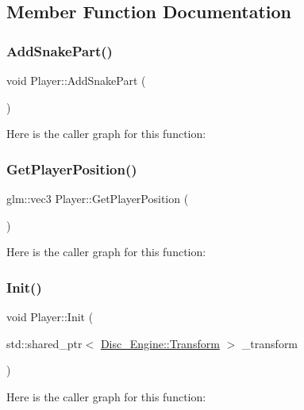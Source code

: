 \subsection{Member Function Documentation}
\mbox{\label{class_player_a58bb36e752a92fd5758900e49cdab663}} 
\subsubsection{\texorpdfstring{Add\+Snake\+Part()}{AddSnakePart()}}
{\footnotesize\ttfamily void Player\+::\+Add\+Snake\+Part (\begin{DoxyParamCaption}{ }\end{DoxyParamCaption})}

Here is the caller graph for this function\+:
\mbox{\label{class_player_a3c32ec6529ebd0e72bd286f80f01ebea}} 
\subsubsection{\texorpdfstring{Get\+Player\+Position()}{GetPlayerPosition()}}
{\footnotesize\ttfamily glm\+::vec3 Player\+::\+Get\+Player\+Position (\begin{DoxyParamCaption}{ }\end{DoxyParamCaption})}

Here is the caller graph for this function\+:
\mbox{\label{class_player_a27da2c33057c830285cb9727fe76d935}} 
\subsubsection{\texorpdfstring{Init()}{Init()}}
{\footnotesize\ttfamily void Player\+::\+Init (\begin{DoxyParamCaption}\item[{std\+::shared\+\_\+ptr$<$ \mbox{\hyperlink{class_disc___engine_1_1_transform}{Disc\+\_\+\+Engine\+::\+Transform}} $>$}]{\+\_\+transform }\end{DoxyParamCaption})}

Here is the caller graph for this function\+:
\mbox{\label{class_player_ac6cfd11d9908832675a20967951ba72f}} 
